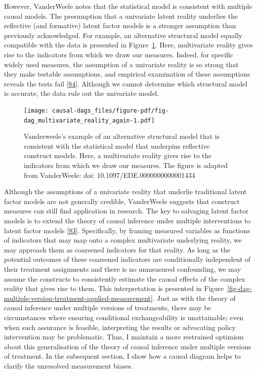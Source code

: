 \documentclass[
  singlecolumn]{article}
\begin{document}
However, VanderWeele notes that the statistical model is consistent with
multiple causal models. The presumption that a univariate latent reality
underlies the reflective (and formative) latent factor models is a
stronger assumption than previously acknowledged. For example, an
alternative structural model equally compatible with the data is
presented in Figure~\ref{fig-dag_multivariate_reality_again}. Here,
multivariate reality gives rise to the indicators from which we draw our
measures. Indeed, for specific widely used measures, the assumption of a
univariate reality is so strong that they make testable assumptions, and
empirical examination of these assumptions reveals the tests fail
{[}\protect\hyperlink{ref-vanderweele2022b}{84}{]}. Although we cannot
determine which structural model is accurate, the data rule out the
univariate model.

\begin{figure}

{\centering \texttt{[image: causal-dags\_files/figure-pdf/fig-dag\_multivariate\_reality\_again-1.pdf]}

}

\caption{\label{fig-dag_multivariate_reality_again}Vanderweele's example
of an alternative structural model that is consistent with the
statistical model that underpins reflective construct models. Here, a
multivariate reality gives rise to the indicators from which we draw our
measures. The figure is adapted from VanderWeele: doi:
10.1097/EDE.0000000000001434}

\end{figure}

Although the assumptions of a univariate reality that underlie
traditional latent factor models are not generally credible, VanderWeele
suggests that construct measures can still find application in research.
The key to salvaging latent factor models is to extend the theory of
causal inference under multiple interventions to latent factor models
{[}\protect\hyperlink{ref-vanderweele2022}{83}{]}. Specifically, by
framing measured variables as functions of indicators that may map onto
a complex multivariate underlying reality, we may approach them as
coarsened indicators for that reality. As long as the potential outcomes
of these coarsened indicators are conditionally independent of their
treatment assignments and there is no unmeasured confounding, we may
assume the constructs to consistently estimate the causal effects of the
complex reality that gives rise to them. This interpretation is
presented in
Figure~\ref{fig-dag-multiple-version-treatment-applied-measurement}.
Just as with the theory of causal inference under multiple versions of
treatments, there may be circumstances where ensuring conditional
exchangeability is unattainable; even when such assurance is feasible,
interpreting the results or advocating policy intervention may be
problematic. Thus, I maintain a more restrained optimism about this
generalisation of the theory of causal inference under multiple versions
of treatment. In the subsequent section, I show how a causal diagram
helps to clarify the unresolved measurement biases.
\end{document}
